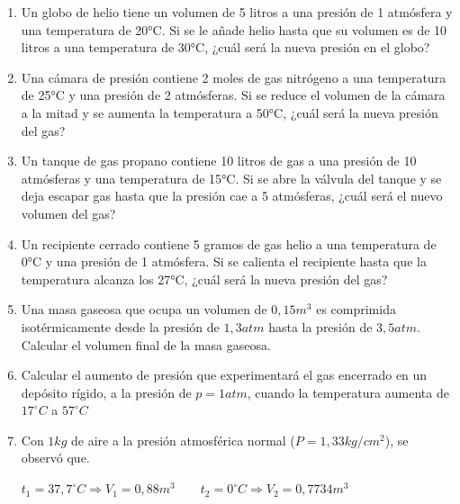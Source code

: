 \documentclass[../main]{subfiles}
\begin{document}
\begin{enumerate}
  \item Un globo de helio tiene un volumen de 5 litros a una presión
    de 1 atmósfera y una temperatura de 20°C. Si se le añade helio
    hasta que su volumen es de 10 litros a una temperatura de 30°C,
    ¿cuál será la nueva presión en el globo?
  \item Una cámara de presión contiene 2 moles de gas nitrógeno a una
    temperatura de 25°C y una presión de 2 atmósferas. Si se reduce
    el volumen de la cámara a la mitad y se aumenta la temperatura a
    50°C, ¿cuál será la nueva presión del gas?

  \item Un tanque de gas propano contiene 10 litros de gas a una
    presión de 10 atmósferas y una temperatura de 15°C. Si se abre la
    válvula del tanque y se deja escapar gas hasta que la presión cae
    a 5 atmósferas, ¿cuál será el nuevo volumen del gas?

  \item Un recipiente cerrado contiene 5 gramos de gas helio a una
    temperatura de 0°C y una presión de 1 atmósfera. Si se calienta
    el recipiente hasta que la temperatura alcanza los 27°C, ¿cuál
    será la nueva presión del gas?

  \item Una masa gaseosa que ocupa un volumen de $0,15m^3$ es
    comprimida isotérmicamente desde la presión de $1,3atm$ hasta la
    presión de $3,5atm$. Calcular el volumen final de la masa gaseosa.
  \item Calcular el aumento de presión que experimentará el gas
    encerrado en un depósito rígido, a la presión de $p=1atm$, cuando
    la temperatura aumenta de $17^\circ C$ a $57^\circ C$
  \item Con $1kg$ de aire a la presión atmosférica normal
    ($P=1,33kg/cm^2$), se observó que.

    $t_1=37,7^\circ C \Rightarrow V_1=0,88m^3 \quad\quad t_2=0^\circ
    C \Rightarrow V_2=0,7734m^3$


\end{enumerate}
\end{document}
